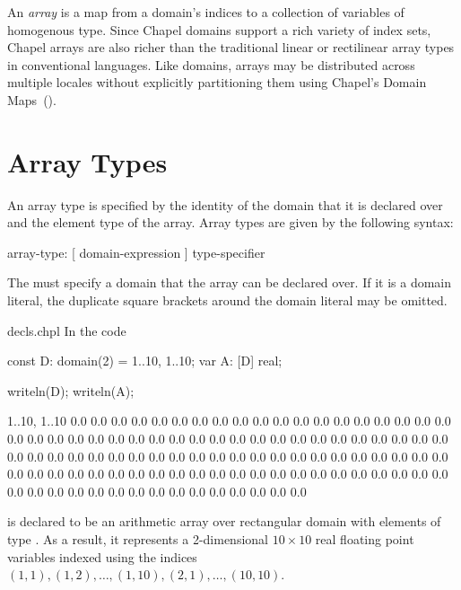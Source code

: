 \label{Arrays}

An \emph{array} is a map from a domain's indices to a collection of
variables of homogenous type.  Since Chapel domains support a rich
variety of index sets, Chapel arrays are also richer than the
traditional linear or rectilinear array types in conventional
languages.  Like domains, arrays may be distributed across multiple
locales without explicitly partitioning them using Chapel's Domain
Maps~().


\section{Array Types}
\label{Array_Types}

An array type is specified by the identity of the domain that it is
declared over and the element type of the array.  Array types are
given by the following syntax:

\begin{syntax}
array-type:
  [ domain-expression ] type-specifier
\end{syntax}
The  must specify a domain that the array can
be declared over.  If it is a domain
literal, the duplicate square brackets around the domain literal may
be omitted.

\begin{chapelexample}{decls.chpl}
In the code
\begin{chapel}
const D: domain(2) = {1..10, 1..10};
var A: [D] real;
\end{chapel}
\begin{chapelpost}
writeln(D);
writeln(A);
\end{chapelpost}
\begin{chapeloutput}
{1..10, 1..10}
0.0 0.0 0.0 0.0 0.0 0.0 0.0 0.0 0.0 0.0
0.0 0.0 0.0 0.0 0.0 0.0 0.0 0.0 0.0 0.0
0.0 0.0 0.0 0.0 0.0 0.0 0.0 0.0 0.0 0.0
0.0 0.0 0.0 0.0 0.0 0.0 0.0 0.0 0.0 0.0
0.0 0.0 0.0 0.0 0.0 0.0 0.0 0.0 0.0 0.0
0.0 0.0 0.0 0.0 0.0 0.0 0.0 0.0 0.0 0.0
0.0 0.0 0.0 0.0 0.0 0.0 0.0 0.0 0.0 0.0
0.0 0.0 0.0 0.0 0.0 0.0 0.0 0.0 0.0 0.0
0.0 0.0 0.0 0.0 0.0 0.0 0.0 0.0 0.0 0.0
0.0 0.0 0.0 0.0 0.0 0.0 0.0 0.0 0.0 0.0
\end{chapeloutput}
 is declared to be an arithmetic array over rectangular
domain  with elements of type .  As a result, it
represents a 2-dimensional $10 \times 10$ real floating point
variables indexed using the indices $(1, 1), (1, 2), \ldots, (1, 10),
(2, 1), \ldots, (10, 10)$.
\end{chapelexample}


